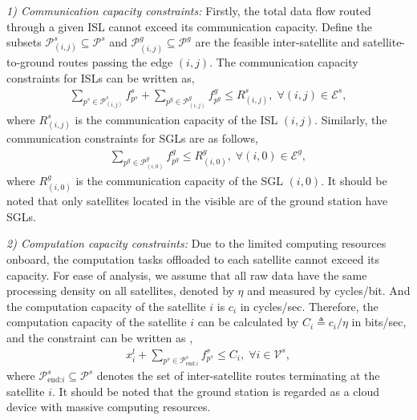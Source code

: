 \documentclass[journal,10pt]{IEEEtran}
\begin{document}
\textit{1) Communication capacity constraints:} Firstly, the total data flow routed through a given ISL cannot exceed its communication capacity. Define the subsets $\mathcal{P}^s_{(i,j)} \subseteq \mathcal{P}^s$ and $\mathcal{P}^g_{(i,j)} \subseteq \mathcal{P}^g$ are the feasible inter-satellite and satellite-to-ground routes passing the edge $(i,j)$. The communication capacity constraints for ISLs can be written as,
\begin{equation}
\begin{aligned}
\label{satcom_con}
\sum_{p^s \in \mathcal{P}^s_{(i,j)}} \!\!\!\!\! f^s_{p^s} + \!\!\! \sum_{p^g \in \mathcal{P}^g_{(i,j)}} \!\!\!\!\! f^g_{p^g} \leq R^s_{(i,j)}, \; \forall (i,j) \in \mathcal{E}^s,
\end{aligned} 
\end{equation} 
where $R^s_{(i,j)}$ is the communication capacity of the ISL $(i,j)$. Similarly, the communication constraints for SGLs are as follows,
\begin{equation}
\begin{aligned}
\label{groundcom_con}
\sum_{p^g \in \mathcal{P}^g_{(i,0)}} \!\!\!\!\! f^g_{p^g} \leq R^g_{(i,0)}, \; \forall (i,0) \in \mathcal{E}^g,
\end{aligned} 
\end{equation} 
where $R^g_{(i,0)}$ is the communication capacity of the SGL $(i,0)$. It should be noted that only satellites located in the visible arc of the ground station have SGLs. 

\textit{2) Computation capacity constraints:} Due to the limited computing resources onboard, the computation tasks offloaded to each satellite cannot exceed its capacity. For ease of analysis, we assume that all raw data have the same processing density on all satellites, denoted by $\eta$ and measured by cycles/bit. And the computation capacity of the satellite $i$ is $c_i$ in cycles/sec. Therefore, the computation capacity of the satellite $i$ can be calculated by $C_i \triangleq c_i/\eta$ in bits/sec, and the constraint can be written as \cite{deng2022task},
\begin{equation}
\begin{aligned}
\label{compute_con}
x^l_i + \!\!\! \sum_{p^s \in \mathcal{P}^s_{\text{end:}i}} \!\!\!\!\! f^s_{p^s} \leq C_i, \; \forall i \in \mathcal{V}^s,
\end{aligned} 
\end{equation} 
where $\mathcal{P}^s_{\text{end:}i} \subseteq \mathcal{P}^s$ denotes the set of inter-satellite routes terminating at the satellite $i$. It should be noted that the ground station is regarded as a cloud device with massive computing resources. 
\end{document}
